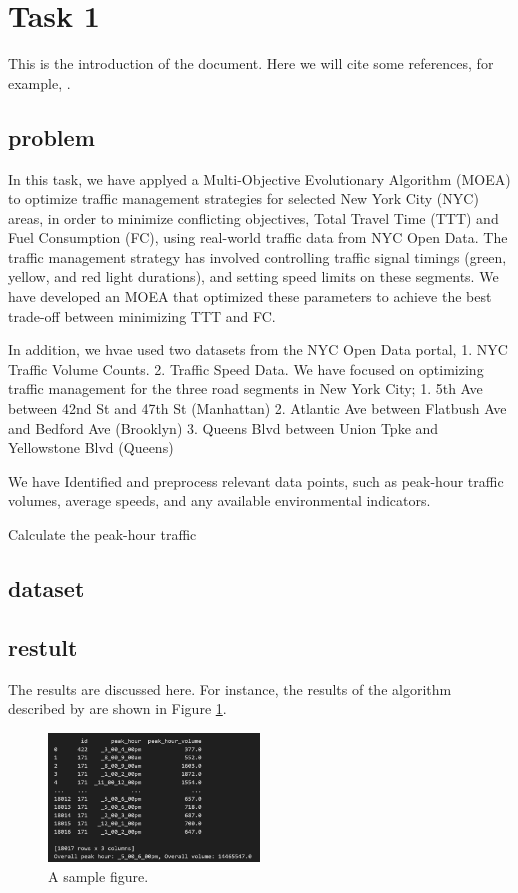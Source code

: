 \section{Task 1}
This is the introduction of the document. Here we will cite some references, for example, \cite{knuth1984texbook}.

\subsection{problem}
In this task, we have applyed a Multi-Objective Evolutionary Algorithm (MOEA) to optimize traffic management
strategies for selected New York City (NYC) areas, in order to  minimize conflicting
objectives, Total Travel Time (TTT) and Fuel Consumption (FC), using real-world traffic data
from NYC Open Data. The traffic management strategy has involved controlling traffic signal timings (green, yellow, and 
red light durations), and setting speed limits on these segments. We have developed an MOEA that optimized these parameters to achieve the best trade-off 
between minimizing TTT and FC.

In addition, we hvae used two datasets from the NYC Open Data portal,
1. NYC Traffic Volume Counts.
2. Traffic Speed Data.
We have focused on optimizing traffic management for the three road segments in New 
York City;  
1. 5th Ave between 42nd St and 47th St (Manhattan) 
2. Atlantic Ave between Flatbush Ave and Bedford Ave (Brooklyn) 
3. Queens Blvd between Union Tpke and Yellowstone Blvd (Queens) 

We have Identified and preprocess relevant data points, such as peak-hour traffic volumes, 
average speeds, and any available environmental indicators.

Calculate the peak-hour traffic


\subsection{dataset}
\subsection{restult}
The results are discussed here. For instance, the results of the algorithm described by \cite{lamport1986latex} are shown in Figure \ref{fig:sample}.

\begin{figure}[h]
    \centering
    \includegraphics[width=0.5\textwidth]{figures/peak_huours.PNG}
    \caption{A sample figure.}
    \label{fig:sample}
\end{figure}
